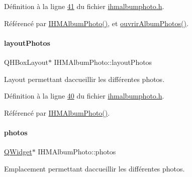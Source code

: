 Définition à la ligne \hyperlink{ihmalbumphoto_8h_source_l00041}{41} du fichier \hyperlink{ihmalbumphoto_8h_source}{ihmalbumphoto.\+h}.



Référencé par \hyperlink{ihmalbumphoto_8cpp_source_l00011}{I\+H\+M\+Album\+Photo()}, et \hyperlink{ihmalbumphoto_8cpp_source_l00038}{ouvrir\+Album\+Photos()}.

\mbox{\label{class_i_h_m_album_photo_aabe492a016823fa63259c8e5d5b58e9d}} 
\paragraph{\texorpdfstring{layout\+Photos}{layoutPhotos}}
{\footnotesize\ttfamily Q\+H\+Box\+Layout$\ast$ I\+H\+M\+Album\+Photo\+::layout\+Photos\hspace{0.3cm}{\ttfamily [private]}}



Layout permettant d\textquotesingle{}accueillir les différentes photos. 



Définition à la ligne \hyperlink{ihmalbumphoto_8h_source_l00040}{40} du fichier \hyperlink{ihmalbumphoto_8h_source}{ihmalbumphoto.\+h}.



Référencé par \hyperlink{ihmalbumphoto_8cpp_source_l00011}{I\+H\+M\+Album\+Photo()}.

\mbox{\label{class_i_h_m_album_photo_a0a58f758260250ac5520f2430d708d87}} 
\paragraph{\texorpdfstring{photos}{photos}}
{\footnotesize\ttfamily \hyperlink{class_q_widget}{Q\+Widget}$\ast$ I\+H\+M\+Album\+Photo\+::photos\hspace{0.3cm}{\ttfamily [private]}}



Emplacement permettant d\textquotesingle{}accueillir les différentes photos. 



